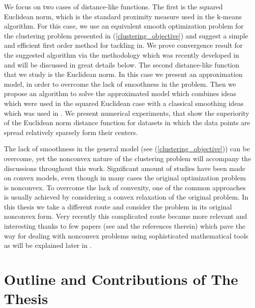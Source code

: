 We focus on two cases of distance-like functions. The first is the squared Euclidean norm, which is the standard proximity measure used in the k-means algorithm. For this case, we use an equivalent smooth optimization problem for the clustering problem presented in (\ref{clustering_objective}) and suggest a simple and efficient first order method for tackling in. We prove convergence result for the suggested algorithm via the methodology which was recently developed in \cite{BST2014} and will be discussed in great details below. The second distance-like function that we study is the Euclidean norm. In this case we present an approximation model, in order to overcome the lack of smoothness in the problem. Then we propose an algorithm to solve the approximated model which combines ideas which were used in the squared Euclidean case with a classical smoothing ideas which was used in \cite{BS2015}. We present numerical experiments, that show the superiority of the Euclidean norm distance function for datasets in which the data points are spread relatively sparsely form their centers. \medskip

The lack of smoothness in the general model (see (\ref{clustering_objective})) can be overcome, yet the nonconvex nature of the clustering problem will accompany the discussions throughout this work. Significant amount of studies have been made on convex models, even though in many cases the original optimization problem is nonconvex. To overcome the lack of convexity, one of the common approaches is usually achieved by considering a convex relaxation of the original problem. In this thesis we take a different route and consider the problem in its original nonconvex form. Very recently this complicated route became more relevant and interesting thanks to few papers (see \cite{AB2009,ABS2013,BST2014} and the references therein) which pave the way for dealing with nonconvex problems using sophisticated mathematical tools as will be explained later in .


\section{Outline and Contributions of The Thesis}

